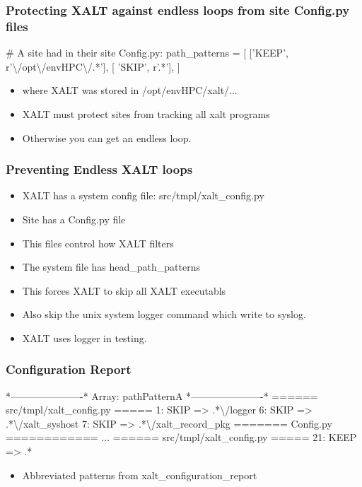 \documentclass{beamer}
\begin{document}
\begin{frame}[fragile]
    \frametitle{Protecting XALT against endless loops from site
      Config.py files}
 {\tiny
    \begin{semiverbatim}
# A site had in their site Config.py: 
path_patterns = [
  ['KEEP',  r'\textbackslash{}/opt\textbackslash{}/envHPC\textbackslash{}/.*'],
  [ 'SKIP',  r'.*'],
  ]
    \end{semiverbatim}
}
  \begin{itemize}
    \item where XALT was stored in /opt/envHPC/xalt/...
    \item XALT must protect sites from tracking all xalt programs
    \item Otherwise you can get an endless loop.
  \end{itemize}
\end{frame}

\begin{frame}[fragile]
    \frametitle{Preventing Endless XALT loops}
  \begin{itemize}
    \item XALT has a system config file: src/tmpl/xalt\_config.py
    \item Site has a Config.py file
    \item This files control how XALT filters
    \item The system file has head\_path\_patterns
    \item This forces XALT to skip all XALT executabls
    \item Also skip the unix system logger command which write to
      syslog.
    \item XALT uses logger in testing.
  \end{itemize}
\end{frame}

\begin{frame}[fragile]
    \frametitle{Configuration Report}
 {\tiny
    \begin{semiverbatim}
*----------------------*
 Array: pathPatternA
*----------------------*
====== src/tmpl/xalt\_config.py =====
   1: SKIP => .*\textbackslash{}/logger
   6: SKIP => .*\textbackslash{}/xalt\_syshost
   7: SKIP => .*\textbackslash{}/xalt\_record\_pkg
======= Config.py ============
...
====== src/tmpl/xalt\_config.py =====
  21: KEEP => .*

    \end{semiverbatim}
}
  \begin{itemize}
    \item Abbreviated patterns from xalt\_configuration\_report
  \end{itemize}
\end{frame}
\end{document}
